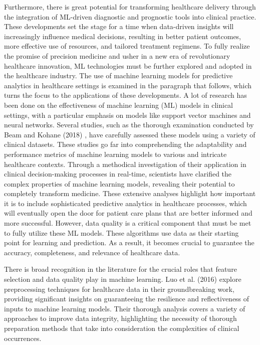 \documentclass[conference]{IEEEtran}
\begin{document}
 Furthermore, there is great potential for transforming healthcare delivery through the integration of ML-driven diagnostic and prognostic tools into clinical practice. These developments set the stage for a time when data-driven insights will increasingly influence medical decisions, resulting in better patient outcomes, more effective use of resources, and tailored treatment regimens. To fully realize the promise of precision medicine and usher in a new era of revolutionary healthcare innovation, ML technologies must be further explored and adopted in the healthcare industry. The use of machine learning models for predictive analytics in healthcare settings is examined in the paragraph that follows, which turns the focus to the applications of these developments. A lot of research has been done on the effectiveness of machine learning (ML) models in clinical settings, with a particular emphasis on models like support vector machines and neural networks. Several studies, such as the thorough examination conducted by Beam and Kohane (2018) \cite{yu2018artificial}, have carefully assessed these models using a variety of clinical datasets. These studies go far into comprehending the adaptability and performance metrics of machine learning models to various and intricate healthcare contexts. Through a methodical investigation of their application in clinical decision-making processes in real-time, scientists have clarified the complex properties of machine learning models, revealing their potential to completely transform medicine. These extensive analyses highlight how important it is to include sophisticated predictive analytics in healthcare processes, which will eventually open the door for patient care plans that are better informed and more successful. However, data quality is a critical component that must be met to fully utilize these ML models. These algorithms use data as their starting point for learning and prediction.  As a result, it becomes crucial to guarantee the accuracy, completeness, and relevance of healthcare data.

    There is broad recognition in the literature for the crucial roles that feature selection and data quality play in machine learning. Luo et al. (2016) \cite{luo2016review} explore preprocessing techniques for healthcare data in their groundbreaking work, providing significant insights on guaranteeing the resilience and reflectiveness of inputs to machine learning models. Their thorough analysis covers a variety of approaches to improve data integrity, highlighting the necessity of thorough preparation methods that take into consideration the complexities of clinical occurrences.
\end{document}
